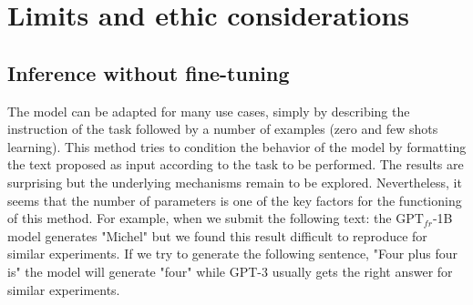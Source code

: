 \section{Limits and ethic considerations}

\subsection{Inference without fine-tuning}  

The 
model \parencite{brown_20} can be adapted for many use cases, simply by describing the instruction of the task followed by a number of examples (zero and few shots learning). This method tries to condition the behavior of the model by formatting the text proposed as input according to the task to be performed. The results are surprising but the underlying mechanisms remain to be explored. Nevertheless, it seems that the number of parameters is one of the key factors for the functioning of this method. 
For example, when we submit the following text: 
the $\text{GPT}_{fr}$-1B model generates "Michel" but we found this result difficult to reproduce for similar experiments. If we try to generate the following sentence, "Four plus four is" the model will generate "four" while GPT-3 usually gets the right answer for similar experiments.

